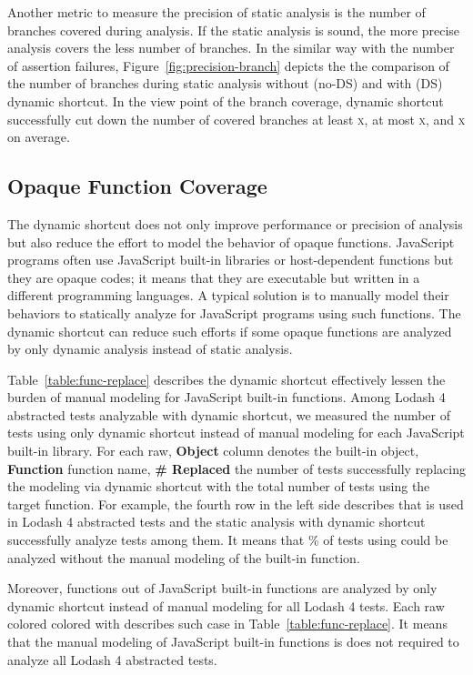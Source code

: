 Another metric to measure the precision of static analysis is the number of
branches covered during analysis.  If the static analysis is sound, the more
precise analysis covers the less number of branches.  In the similar way with
the number of assertion failures, Figure~\ref{fig:precision-branch} depicts the
the comparison of the number of branches during static analysis without (no-DS)
and with (DS) dynamic shortcut.  In the view point of the branch coverage,
dynamic shortcut successfully cut down the number of covered branches at least
\textsc{x}, at most \textsc{x}, and
\textsc{x} on average.



\subsection{Opaque Function Coverage}

The dynamic shortcut does not only improve performance or precision of analysis
but also reduce the effort to model the behavior of opaque functions.
JavaScript programs often use JavaScript built-in libraries or host-dependent
functions but they are opaque codes; it means that they are executable but
written in a different programming languages.  A typical solution is to
manually model their behaviors to statically analyze for JavaScript programs
using such functions.  The dynamic shortcut can reduce such efforts if some
opaque functions are analyzed by only dynamic analysis instead of static
analysis.

Table~\ref{table:func-replace} describes the dynamic shortcut effectively lessen
the burden of manual modeling for JavaScript built-in functions.  Among Lodash 4
 abstracted tests analyzable with dynamic shortcut, we measured the
number of tests using only dynamic shortcut instead of manual modeling for each
JavaScript built-in library.  For each raw, \textbf{Object} column denotes the
built-in object, \textbf{Function} function name, \textbf{\# Replaced} the
number of tests successfully replacing the modeling via dynamic shortcut with
the total number of tests using the target function.  For example, the fourth
row in the left side describes that  is used in
 Lodash 4 abstracted tests and the static analysis with dynamic
shortcut successfully analyze  tests among them.  It means that
\% of tests using  could be analyzed
without the manual modeling of the built-in function.

Moreover,  functions out of  JavaScript built-in functions
are analyzed by only dynamic shortcut instead of manual modeling for all Lodash
4 tests.  Each raw colored colored with  describes such case in
Table~\ref{table:func-replace}.  It means that the manual modeling of  
JavaScript built-in functions is does not required to analyze all Lodash 4
abstracted tests. 
